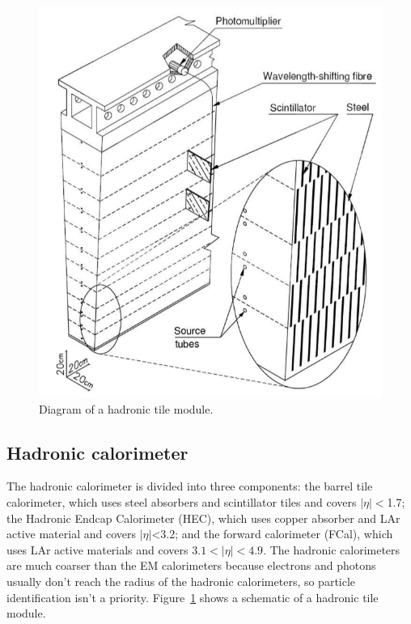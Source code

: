 \begin{figure}[h]
\begin{minipage}[b]{0.48\textwidth}
\includegraphics[width=\textwidth]{fig/atlas/tile.png}
\caption{Diagram of a hadronic tile module\cite{cern-jinst-atlas}.}
\label{fig:tileModule}
\end{minipage}
\end{figure}
\subsection{Hadronic calorimeter}
The hadronic calorimeter is divided into three components: the barrel tile calorimeter, which uses steel absorbers and scintillator tiles and covers $|\eta| <$1.7; the Hadronic Endcap Calorimeter (HEC), which uses copper absorber and LAr active material and covers $|\eta|$<3.2; and the forward calorimeter (FCal), which uses LAr active materials and covers $3.1 < |\eta| < 4.9$. The hadronic calorimeters are much coarser than the EM calorimeters because electrons and photons usually don't reach the radius of the hadronic calorimeters, so particle identification isn't a priority. Figure~\ref{fig:tileModule} shows a schematic of a hadronic tile module.
